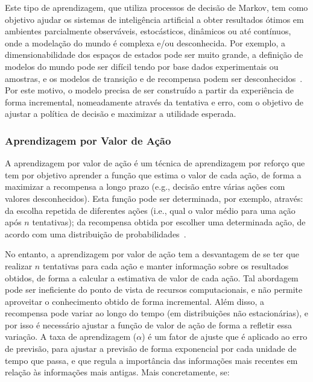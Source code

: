 Este tipo de aprendizagem, que utiliza processos de decisão de Markov, tem como objetivo ajudar os sistemas de inteligência artificial a obter resultados ótimos em ambientes parcialmente observáveis, estocásticos, dinâmicos ou até contínuos, onde a modelação do mundo é complexa e/ou desconhecida.
Por exemplo, a dimensionabilidade dos espaços de estados pode ser muito grande, a definição de modelos do mundo pode ser difícil tendo por base dados experimentais ou amostras, e os modelos de transição e de recompensa podem ser desconhecidos~\cite{isel:iasa:slides:aprendizagem-por-reforco}.
Por este motivo, o modelo precisa de ser construído a partir da experiência de forma incremental, nomeadamente através da tentativa e erro, com o objetivo de ajustar a política de decisão e maximizar a utilidade esperada.

\subsubsection{Aprendizagem por Valor de Ação}\label{subsubsec:aprendizagem-por-valor-acao}

A aprendizagem por valor de ação é um técnica de aprendizagem por reforço que tem por objetivo aprender a função que estima o valor de cada ação, de forma a maximizar a recompensa a longo prazo (e.g., decisão entre várias ações com valores desconhecidos).
Esta função pode ser determinada, por exemplo, através: da escolha repetida de diferentes ações (i.e., qual o valor médio para uma ação após $n$ tentativas); da recompensa obtida por escolher uma determinada ação, de acordo com uma distribuição de probabilidades~\cite{isel:iasa:slides:aprendizagem-por-reforco}.

No entanto, a aprendizagem por valor de ação tem a desvantagem de se ter que realizar $n$ tentativas para cada ação e manter informação sobre os resultados obtidos, de forma a calcular a estimativa de valor de cada ação.
Tal abordagem pode ser ineficiente do ponto de vista de recursos computacionais, e não permite aproveitar o conhecimento obtido de forma incremental.
Além disso, a recompensa pode variar ao longo do tempo (em distribuições não estacionárias), e por isso é necessário ajustar a função de valor de ação de forma a refletir essa variação.
A taxa de aprendizagem ($\alpha$) é um fator de ajuste que é aplicado ao erro de previsão, para ajustar a previsão de forma exponencial por cada unidade de tempo que passa, e que regula a importância das informações mais recentes em relação às informações mais antigas.
Mais concretamente, se:


